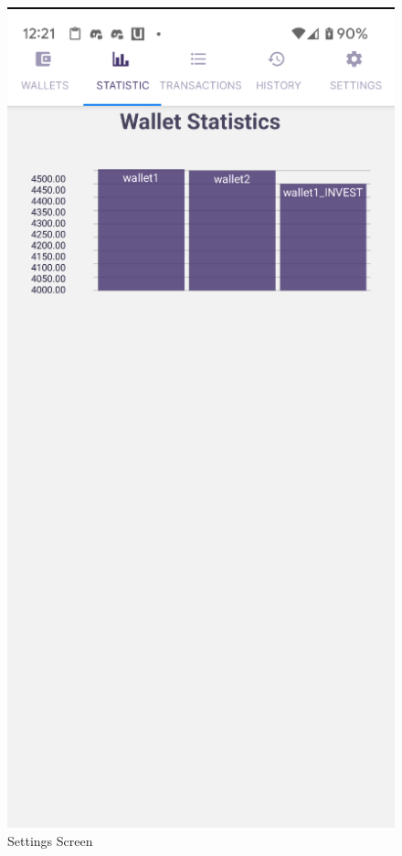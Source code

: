\begin{figure}[htbp]
\begin{minipage}[t]{0.2\textwidth}
        \caption{Settings Screen}
        \label{fig:settings}
    \end{minipage}
    \hfill
    \begin{minipage}[t]{0.2\textwidth}
        \centering
        \includegraphics[width=\textwidth]{Screen Shots/Moneager/StatisticsScreen.png}

\end{minipage}
\end{figure}
